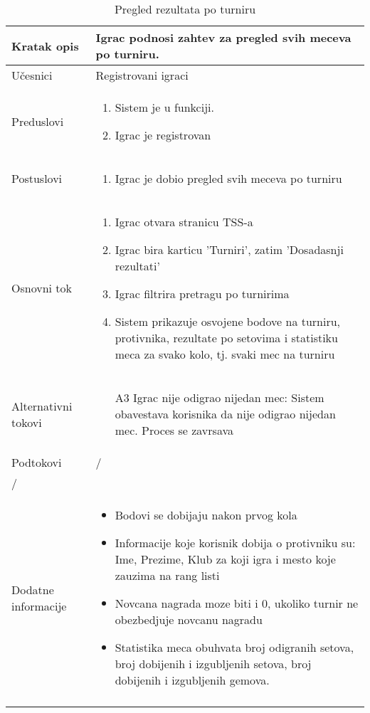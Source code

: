 \documentclass{article}
\begin{document}
\begin{longtable}{| p{} | p{} |} 
\hline
    Kratak opis & Igrac podnosi zahtev za pregled svih meceva po turniru.\\ 
\hline    
    Učesnici & Registrovani igraci
    \\
\hline
   Preduslovi & \begin{enumerate}
       \item Sistem je u funkciji.
       \item Igrac je registrovan
   \end{enumerate}\\
\hline  
    Postuslovi & \begin{enumerate}
        \item Igrac je dobio pregled svih meceva po turniru
    \end{enumerate}\\
\hline
    Osnovni tok & \begin{enumerate}
        \item Igrac otvara stranicu TSS-a
        \item Igrac bira karticu 'Turniri', zatim 'Dosadasnji rezultati'
        \item Igrac filtrira pretragu po turnirima
        \item Sistem prikazuje osvojene bodove na turniru, protivnika, rezultate po setovima i statistiku meca za svako kolo, tj. svaki mec na turniru
    \end{enumerate}\\
\hline
    Alternativni tokovi & \begin{itemize}
        \item[A3] Igrac nije odigrao nijedan mec: Sistem obavestava korisnika da nije odigrao nijedan mec. Proces se zavrsava
    \end{itemize}\\
\hline
    Podtokovi & /\\
\hline
    /\\
\hline
    Dodatne informacije & \begin{itemize}
        \item Bodovi se dobijaju nakon prvog kola
        \item Informacije koje korisnik dobija o protivniku su: Ime, Prezime, Klub za koji igra i mesto koje zauzima na rang listi
        \item Novcana nagrada moze biti i 0, ukoliko turnir ne obezbedjuje novcanu nagradu
        \item Statistika meca obuhvata broj odigranih setova, broj dobijenih i izgubljenih setova, broj dobijenih i izgubljenih gemova.
    \end{itemize}\\
\hline
\caption{Pregled rezultata po turniru} %
\end{longtable}


\end{document}
